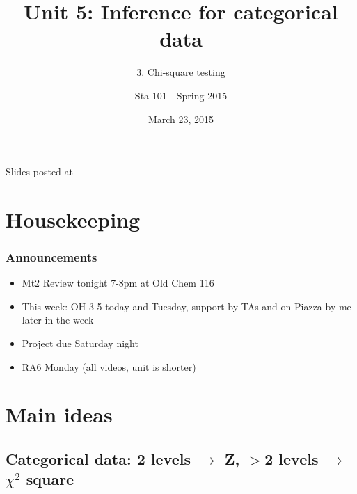 \documentclass[slidestop,compress,mathserif,12pt,t,professionalfonts,xcolor=table]{beamer}
\title{Unit 5: Inference for categorical data}
\subtitle{3. Chi-square testing}
\author{Sta 101 - Spring 2015}
\date{March 23, 2015}
\institute{Duke University, Department of Statistical Science}
\begin{document}


\begin{frame}[plain]

\titlepage
\vfill
{\scriptsize {} \hfill Slides posted at  \webLink{\CourseSite}{\CourseSite}}
\addtocounter{framenumber}{-1} 

\end{frame}


\section{Housekeeping}


\begin{frame}
\frametitle{Announcements}

\begin{itemize}

\item Mt2 Review tonight 7-8pm at Old Chem 116

\item This week: OH 3-5 today and Tuesday, support by TAs and on Piazza by me later in the week

\item Project due Saturday night

\item RA6 Monday (all videos, unit is shorter)

\end{itemize}

\end{frame}


\section{Main ideas}


\subsection{Categorical data: 2 levels $\rightarrow$ Z, $>$2 levels $\rightarrow$ $\chi^2$ square}
\label{mi1}

\end{document}
